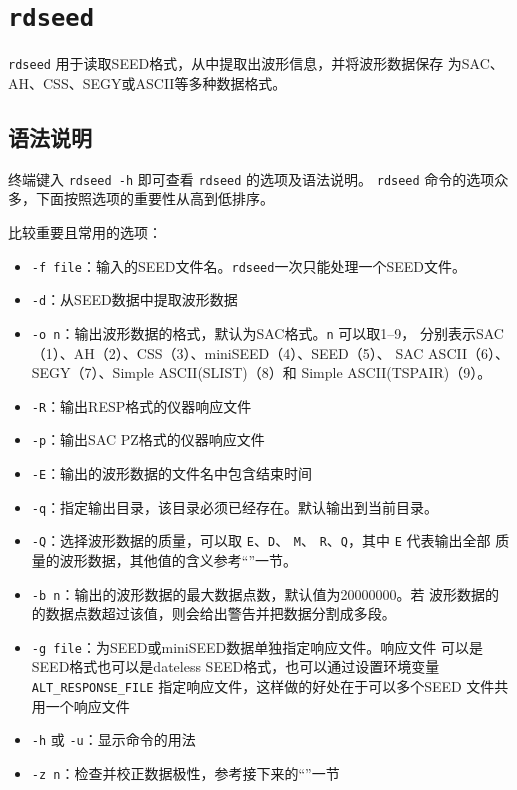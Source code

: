 \section{\texttt{rdseed}}
\label{sec:rdseed}

\texttt{rdseed} 用于读取SEED格式，从中提取出波形信息，并将波形数据保存
为SAC、AH、CSS、SEGY或ASCII等多种数据格式。

\subsection{语法说明}
终端键入 \texttt{rdseed -h} 即可查看 \texttt{rdseed} 的选项及语法说明。
\texttt{rdseed} 命令的选项众多，下面按照选项的重要性从高到低排序。

比较重要且常用的选项：
\begin{itemize}
\item \texttt{-f file}：输入的SEED文件名。\texttt{rdseed}一次只能处理一个SEED文件。
\item \texttt{-d}：从SEED数据中提取波形数据
\item \texttt{-o n}：输出波形数据的格式，默认为SAC格式。\texttt{n} 可以取1--9，
    分别表示SAC（1）、AH（2）、CSS（3）、miniSEED（4）、SEED（5）、
    SAC ASCII（6）、SEGY（7）、Simple ASCII(SLIST)（8）和
    Simple ASCII(TSPAIR)（9）。
\item \texttt{-R}：输出RESP格式的仪器响应文件
\item \texttt{-p}：输出SAC PZ格式的仪器响应文件
\item \texttt{-E}：输出的波形数据的文件名中包含结束时间
\item \texttt{-q}：指定输出目录，该目录必须已经存在。默认输出到当前目录。
\item \texttt{-Q}：选择波形数据的质量，可以取 \texttt{E}、\texttt{D}、
    \texttt{M}、 \texttt{R}、\texttt{Q}，其中 \texttt{E} 代表输出全部
    质量的波形数据，其他值的含义参考``''一节。
\item \texttt{-b n}：输出的波形数据的最大数据点数，默认值为20000000。若
    波形数据的的数据点数超过该值，则会给出警告并把数据分割成多段。
\item \texttt{-g file}：为SEED或miniSEED数据单独指定响应文件。响应文件
    可以是SEED格式也可以是dateless SEED格式，也可以通过设置环境变量
    \verb|ALT_RESPONSE_FILE| 指定响应文件，这样做的好处在于可以多个SEED
    文件共用一个响应文件
\item \texttt{-h} 或 \texttt{-u}：显示命令的用法
\item \texttt{-z n}：检查并校正数据极性，参考接下来的``''一节
\end{itemize}


